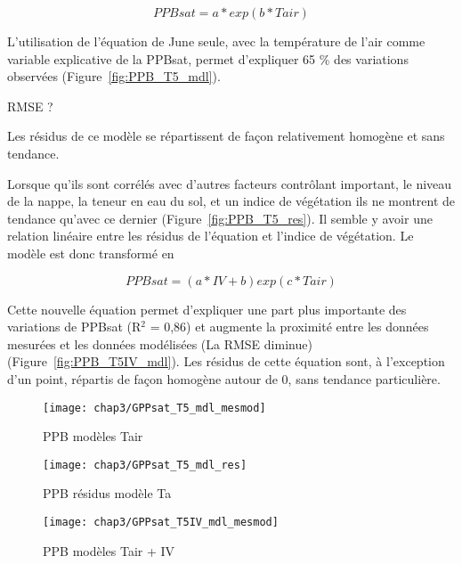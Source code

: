 \begin{equation}
PPBsat = a*exp(b*Tair)
\end{equation}

L'utilisation de l'équation de June seule, avec la température de l'air comme variable explicative de la PPBsat, permet d'expliquer 65 \% des variations observées (Figure~\ref{fig:PPB_T5_mdl}).

RMSE ?

Les résidus de ce modèle se répartissent de façon relativement homogène et sans tendance.

Lorsque qu'ils sont corrélés avec d'autres facteurs contrôlant important, le niveau de la nappe, la teneur en eau du sol, et un indice de végétation ils ne montrent de tendance qu'avec ce dernier (Figure~\ref{fig:PPB_T5_res}).
Il semble y avoir une relation linéaire entre les résidus de l'équation et l'indice de végétation.
Le modèle est donc transformé en 

\begin{equation}
PPBsat = (a * IV + b)exp(c*Tair)
\end{equation}

Cette nouvelle équation permet d'expliquer une part plus importante des variations de PPBsat (R$^{2}$ = 0,86) et augmente la proximité entre les données mesurées et les données modélisées (La RMSE diminue) (Figure~\ref{fig:PPB_T5IV_mdl}).
Les résidus de cette équation sont, à l'exception d'un point, répartis de façon homogène autour de 0, sans tendance particulière.


\begin{figure}
\centering
\texttt{[image: chap3/GPPsat\_T5\_mdl\_mesmod]}
\caption{PPB modèles Tair}
\label{fig:PPBsat_T5_mdl}
\end{figure}

\begin{figure}
\centering
\texttt{[image: chap3/GPPsat\_T5\_mdl\_res]}
\caption{PPB résidus modèle Ta}
\label{fig:PPBsat_T5_res}
\end{figure}

\begin{figure}
\centering
\texttt{[image: chap3/GPPsat\_T5IV\_mdl\_mesmod]}
\caption{PPB modèles Tair + IV}
\label{fig:PPB_TaIV_mdl}
\end{figure}

